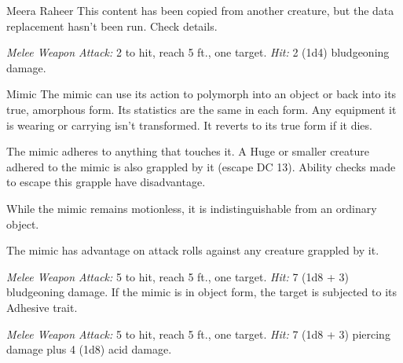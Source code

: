 \documentclass[10pt,a4paper,twoside,bg=print,twocolumn,openany,nodeprecatedcode]{dndbook}
\begin{document}
\begin{DndMonster}[float=t]{Meera Raheer}
\DndMonsterBasics[
armor-class = {10},
hit-points = {\DndDice{1d8}},
speed = {30 ft.}
]
\DndMonsterAbilityScores[
 str = 10,
 dex = 10,
 con = 10,
 int = 10,
 wis = 10,
 cha = 10
]
\DndMonsterDetails[
languages = {any one language (usually Common)},
challenge = 0,
]
This content has been copied from another creature, but the data replacement hasn't been run. Check details.

\textsl{Melee Weapon Attack:} 2 to hit, reach 5 ft., one target. \textsl{Hit:} 2 (1d4) bludgeoning damage.

\end{DndMonster}



\begin{DndMonster}[float=t]{Mimic}
\DndMonsterBasics[
armor-class = {12 (natural armor)},
hit-points = {\DndDice{9d8 + 18}},
speed = {15 ft.}
]
\DndMonsterAbilityScores[
 str = 17,
 dex = 12,
 con = 15,
 int = 5,
 wis = 13,
 cha = 8
]
\DndMonsterDetails[
skills = {Stealth +5},
damage-immunities = {acid},
condition-immunities = {prone},
senses = {darkvision 60 ft., passive perception 11},
challenge = 2,
]
The mimic can use its action to polymorph into an object or back into its true, amorphous form. Its statistics are the same in each form. Any equipment it is wearing or carrying isn't transformed. It reverts to its true form if it dies.

The mimic adheres to anything that touches it. A Huge or smaller creature adhered to the mimic is also grappled by it (escape DC 13). Ability checks made to escape this grapple have disadvantage.

While the mimic remains motionless, it is indistinguishable from an ordinary object.

The mimic has advantage on attack rolls against any creature grappled by it.

\textsl{Melee Weapon Attack:} 5 to hit, reach 5 ft., one target. \textsl{Hit:} 7 (1d8 + 3) bludgeoning damage. If the mimic is in object form, the target is subjected to its Adhesive trait.

\textsl{Melee Weapon Attack:} 5 to hit, reach 5 ft., one target. \textsl{Hit:} 7 (1d8 + 3) piercing damage plus 4 (1d8) acid damage.

\end{DndMonster}
\end{document}

